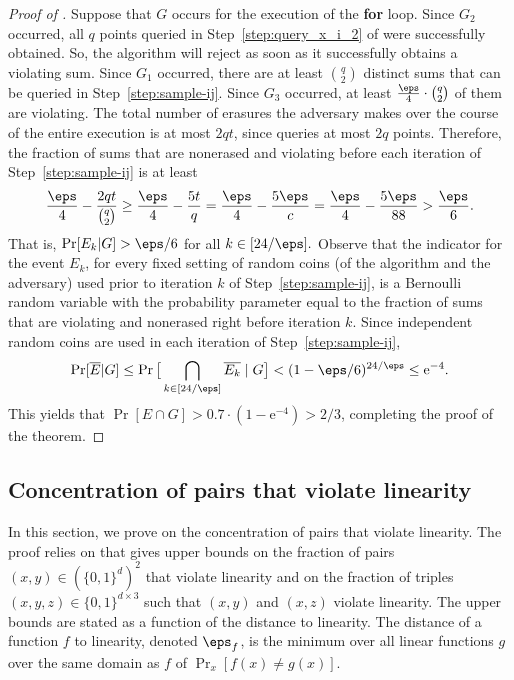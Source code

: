 \documentclass[11pt]{article}
\numberwithin{equation}{section}
\theoremstyle{definition}
\theoremstyle{plain}
\newcommand{\eee}{\mathrm e}
\begin{document}
\begin{proof}[Proof of ]
Suppose that $G$ occurs for the execution of the \textbf{for} loop. Since $G_2$ occurred, all $q$ points queried in Step~\ref{step:query_x_i_2} of  were successfully obtained. So, the algorithm will reject as soon as it successfully obtains a violating sum. Since $G_1$ occurred, there are at least $\binom{q}{2}$ distinct sums that can be queried in Step~\ref{step:sample-ij}. Since $G_3$ occurred, at least $\frac \eps 4\cdot \binom{q}{2}$ of them are violating.
%
The total number of erasures the adversary makes over the course of the entire execution is at most $2qt$, since  queries at most $2q$ points.
Therefore, the fraction of sums that are nonerased and violating before each iteration of Step~\ref{step:sample-ij} is at least
\begin{align*}
\frac \eps 4 -\frac {2qt}{\binom q 2}
\geq\frac \eps 4 -\frac {5t}{q}
=\frac \eps 4 -\frac {5\eps}{c}
=\frac \eps 4 -\frac {5\eps}{88}
> \frac \eps 6. 
\end{align*}
That is, $\Pr[E_k|G]> \eps/6$ for all $k\in[24/\eps].$
Observe that the indicator for the event $E_k$, for every fixed setting of random coins (of the algorithm and the adversary) used prior to iteration $k$ of Step~\ref{step:sample-ij}, 
is a Bernoulli random variable with the probability parameter equal to the fraction of sums that are violating and nonerased right before iteration $k$. %
Since independent random coins are used in each iteration of Step~\ref{step:sample-ij},
%
\begin{align*}
   \Pr[\overline{E}|G]
\leq \Pr\big[\bigcap_{k\in[24/\eps]}\overline{E_k}\mid G\big]
%
< (1-\eps/6)^{24/\eps}
\leq \eee^{-4}. 
\end{align*}
This yields that $\Pr[E\cap G]>0.7\cdot(1-\eee^{-4})> 2/3$, completing the proof of the theorem.
\end{proof}


\subsection{Concentration of pairs that violate linearity}\label{sec:violating_sums}

In this section, we prove  on the concentration of pairs that violate linearity. %
The proof relies on   that gives upper bounds on the fraction of pairs $(x,y) \in (\{0,1\}^d)^2$ that violate linearity and on the fraction of triples $(x, y, z) \in \{0,1\}^{d\times 3}$ such that $(x,y)$ and $(x,z)$ violate linearity. The upper bounds are stated as a function of the distance to linearity.
%
%
%
The distance of a function $f$ to linearity, denoted $\eps_f$, is the minimum over all linear functions $g$ over the same domain as $f$ of 
$\Pr_x[f(x)\neq g(x)]$.
%
\end{document}
